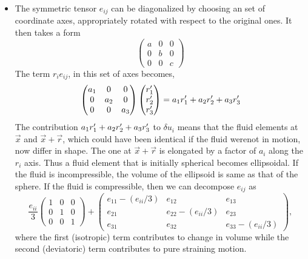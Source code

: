 \begin{itemize}
\item The symmetric tensor $e_{ij}$ can be diagonalized by choosing an set of coordinate axes, appropriately rotated with respect to the original ones. It then takes a form
\[
\begin{pmatrix} a & 0 & 0 \\
 0 & b & 0 \\
 0 & 0 & c
\end{pmatrix}
\]
The term $r_i e_{ij}$, in this set of axes becomes,
\[
\begin{pmatrix} 
 a_1 & 0 & 0 \\
 0 & a_2 & 0 \\
 0 & 0 & a_3
\end{pmatrix}
\begin{pmatrix}
r_1^\prime \\
r_2^\prime \\
r_3^\prime
\end{pmatrix} = a_1r_1^\prime + a_2r_2^\prime + a_3r_3^\prime
\]
The contribution $a_1r_1^\prime + a_2r_2^\prime + a_3r_3^\prime$ to $\delta{u}_i$ means that the fluid elements at $\vec{x}$ and $\vec{x} + \vec{r}$, which could have been identical if the
fluid werenot in motion, now differ in shape. The one at $\vec{x} + \vec{r}$ is elongated by a factor of $a_i$ along the $r_i$ axis. Thus a fluid element that is initially spherical 
becomes ellipsoidal. If the fluid is incompressible, the volume of the ellipsoid is same as that of the sphere. If the fluid is compressible, then we can decompose $e_{ij}$ as
\[
\frac{e_{ii}}{3}\begin{pmatrix}
1 & 0 & 0 \\
0 & 1 & 0 \\
0 & 0 & 1
\end{pmatrix}
+
\begin{pmatrix}
e_{11} - (e_{ii}/3) & e_{12} & e_{13} \\
e_{21} & e_{22} - (e_{ii}/3) & e_{23} \\
e_{31} & e_{32} & e_{33} - (e_{ii}/3)
\end{pmatrix},
\]
where the first (isotropic) term contributes to change in volume while the second (deviatoric) term contributes to pure straining motion.


\end{itemize}
